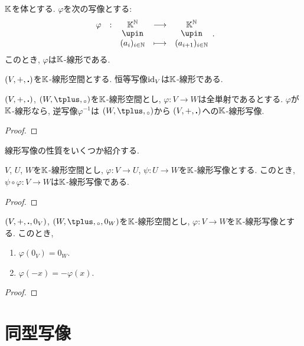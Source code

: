 \begin{example}
  $\mathbb{K}$を体とする.
  $\varphi$を次の写像とする:
  \begin{align*}
    \shazo{\varphi}{\KK^\NN}{\KK^\NN}{(a_i)_{i\in \NN}}{(a_{i+1})_{i\in \NN}}.
  \end{align*}
  このとき, $\varphi$は$\mathbb{K}$-線形である.
\end{example}

\begin{example}
  $(V,+,\mathbin{\boldsymbol{.}})$を$\mathbb{K}$-線形空間とする.
  恒等写像$\operatorname{id}_V$は$\mathbb{K}$-線形である.
\end{example}
\begin{lemma}
  $(V,+,\mathbin{\boldsymbol{.}})$, $(W,\pplus,\aact)$を$\mathbb{K}$-線形空間とし,
  $\varphi\colon V\to W$は全単射であるとする.
  $\varphi$が$\mathbb{K}$-線形なら,
  逆写像$\varphi^{-1}$は
  $(W,\pplus,\aact)$から
  $(V,+,\mathbin{\boldsymbol{.}})$への$\mathbb{K}$-線形写像.
\end{lemma}
\begin{proof}\end{proof}

線形写像の性質をいくつか紹介する.
\begin{prop}
  $V$, $U$, $W$を$\mathbb{K}$-線形空間とし,
  $\varphi\colon V\to U$,
  $\psi\colon U\to W$を$\mathbb{K}$-線形写像とする.
  このとき, $\psi\circ\varphi\colon V\to W$は$\mathbb{K}$-線形写像である.
\end{prop}
\begin{proof}\end{proof}

\begin{prop}
  $(V,+,\mathbin{\boldsymbol{.}},0_V)$, $(W,\pplus,\aact,0_W)$を$\mathbb{K}$-線形空間とし,
  $\varphi\colon V\to W$を$\mathbb{K}$-線形写像とする.
  このとき,
  \begin{enumerate}
    \item $\varphi(0_V)=0_W$.
    \item $\varphi(-x)=-\varphi(x)$.
  \end{enumerate}
\end{prop}
\begin{proof}\end{proof}


\section{同型写像}

